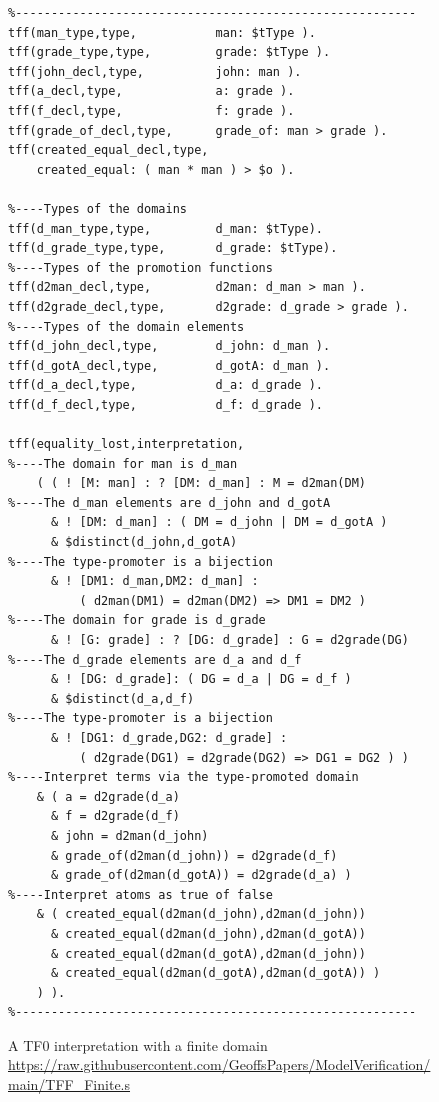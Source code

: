 \documentclass[letterpaper]{article}
\begin{document}
\begin{figure}[t!]
\scriptsize
{}
\begin{verbatim}
%--------------------------------------------------------
tff(man_type,type,           man: $tType ).
tff(grade_type,type,         grade: $tType ).
tff(john_decl,type,          john: man ).
tff(a_decl,type,             a: grade ).
tff(f_decl,type,             f: grade ).
tff(grade_of_decl,type,      grade_of: man > grade ).
tff(created_equal_decl,type, 
    created_equal: ( man * man ) > $o ).

%----Types of the domains
tff(d_man_type,type,         d_man: $tType).
tff(d_grade_type,type,       d_grade: $tType).
%----Types of the promotion functions
tff(d2man_decl,type,         d2man: d_man > man ).
tff(d2grade_decl,type,       d2grade: d_grade > grade ).
%----Types of the domain elements
tff(d_john_decl,type,        d_john: d_man ).
tff(d_gotA_decl,type,        d_gotA: d_man ).
tff(d_a_decl,type,           d_a: d_grade ).
tff(d_f_decl,type,           d_f: d_grade ).

tff(equality_lost,interpretation,
%----The domain for man is d_man
    ( ( ! [M: man] : ? [DM: d_man] : M = d2man(DM)
%----The d_man elements are d_john and d_gotA
      & ! [DM: d_man] : ( DM = d_john | DM = d_gotA )
      & $distinct(d_john,d_gotA)
%----The type-promoter is a bijection
      & ! [DM1: d_man,DM2: d_man] :
          ( d2man(DM1) = d2man(DM2) => DM1 = DM2 )
%----The domain for grade is d_grade
      & ! [G: grade] : ? [DG: d_grade] : G = d2grade(DG)
%----The d_grade elements are d_a and d_f
      & ! [DG: d_grade]: ( DG = d_a | DG = d_f )
      & $distinct(d_a,d_f)
%----The type-promoter is a bijection
      & ! [DG1: d_grade,DG2: d_grade] :
          ( d2grade(DG1) = d2grade(DG2) => DG1 = DG2 ) )
%----Interpret terms via the type-promoted domain
    & ( a = d2grade(d_a)
      & f = d2grade(d_f)
      & john = d2man(d_john)
      & grade_of(d2man(d_john)) = d2grade(d_f)
      & grade_of(d2man(d_gotA)) = d2grade(d_a) )
%----Interpret atoms as true of false
    & ( created_equal(d2man(d_john),d2man(d_john))
      & created_equal(d2man(d_john),d2man(d_gotA))
      & created_equal(d2man(d_gotA),d2man(d_john))
      & created_equal(d2man(d_gotA),d2man(d_gotA)) ) 
    ) ).
%--------------------------------------------------------
\end{verbatim}
\caption{A TF0 interpretation with a finite domain \\
{\scriptsize \url{https://raw.githubusercontent.com/GeoffsPapers/ModelVerification/main/TFF_Finite.s}}}
\label{TF0FiniteInterpretation}
\end{figure}
\end{document}
